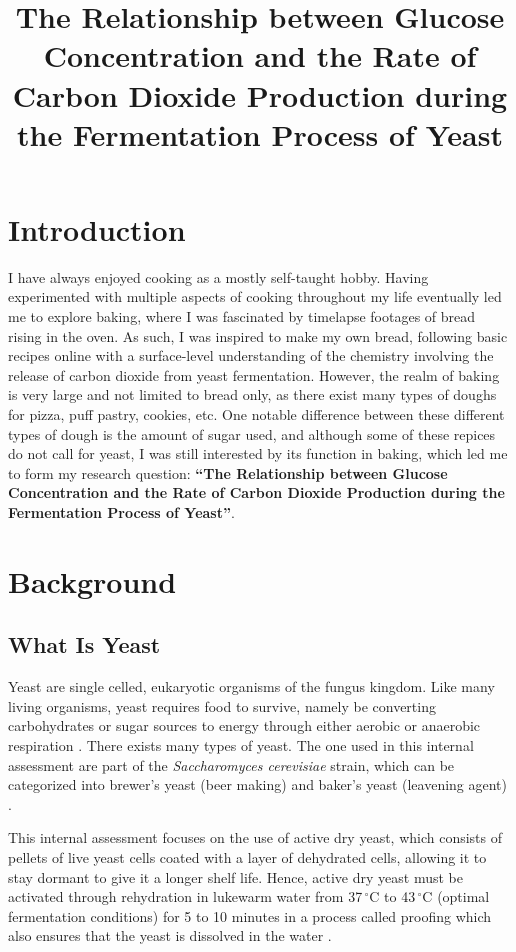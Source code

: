 \documentclass{article}
\title{\textbf{The Relationship between Glucose Concentration and the Rate of Carbon Dioxide Production during the Fermentation Process of Yeast}}
\author{}
\date{}
\begin{document}
\maketitle
\newpage
{}

\section{Introduction}
I have always enjoyed cooking as a mostly self-taught hobby. Having experimented with multiple aspects of cooking throughout my life eventually led me to explore baking, where I was fascinated by timelapse footages of bread rising in the oven. As such, I was inspired to make my own bread, following basic recipes online with a surface-level understanding of the chemistry involving the release of carbon dioxide from yeast fermentation. However, the realm of baking is very large and not limited to bread only, as there exist many types of doughs for pizza, puff pastry, cookies, etc. One notable difference between these different types of dough is the amount of sugar used, and although some of these repices do not call for yeast, I was still interested by its function in baking, which led me to form my research question: \textbf{``The Relationship between Glucose Concentration and the Rate of Carbon Dioxide Production during the Fermentation Process of Yeast''}.

\section{Background}

\subsection{What Is Yeast}
Yeast are single celled, eukaryotic organisms of the fungus kingdom. Like many living organisms, yeast requires food to survive, namely be converting carbohydrates or sugar sources to energy through either aerobic or anaerobic respiration \parencite{ref}. There exists many types of yeast. The one used in this internal assessment are part of the \emph{Saccharomyces cerevisiae} strain, which can be categorized into brewer's yeast (beer making) and baker's yeast (leavening agent) \parencite{ref}.

\medskip

This internal assessment focuses on the use of active dry yeast, which consists of pellets of live yeast cells coated with a layer of dehydrated cells, \parencite{ref} allowing it to stay dormant to give it a longer shelf life. Hence, active dry yeast must be activated through rehydration in lukewarm water from 37$\,^{\circ}$C to 43$\,^{\circ}$C (optimal fermentation conditions) for 5 to 10 minutes in a process called proofing which also ensures that the yeast is dissolved in the water \parencite{ref}.
\end{document}
